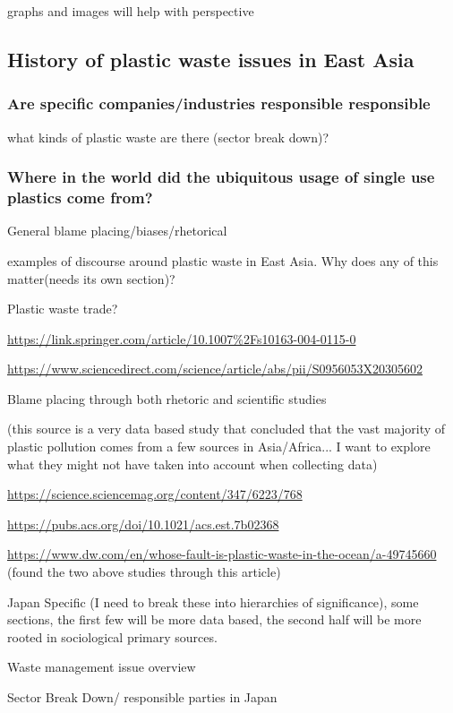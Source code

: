 \documentclass{book}\usepackage{knitr}
\begin{document}
graphs and images will help with perspective

\subsection{History of plastic waste issues in East Asia}

\subsubsection{Are specific companies/industries responsible responsible}

what kinds of plastic waste are there (sector break down)? 

\subsubsection{Where in the world did the ubiquitous usage of single use plastics come from?}

General blame placing/biases/rhetorical 

examples of discourse around plastic waste in East Asia. Why does any of this matter(needs its own section)?

Plastic waste trade? 

\url{https://link.springer.com/article/10.1007%2Fs10163-004-0115-0}

\url{https://www.sciencedirect.com/science/article/abs/pii/S0956053X20305602}

Blame placing through both rhetoric and scientific studies

(this source is a very data based study that concluded that the vast majority of plastic pollution comes from a few sources in Asia/Africa... I want to explore what they might not have taken into account when collecting data)

\url{https://science.sciencemag.org/content/347/6223/768}

\url{https://pubs.acs.org/doi/10.1021/acs.est.7b02368}

\url{https://www.dw.com/en/whose-fault-is-plastic-waste-in-the-ocean/a-49745660} (found the two above studies through this article)

Japan Specific (I need to break these into hierarchies of significance), some sections, the first  few will be more data based, the second half will be more rooted in sociological primary sources.

Waste management issue overview

Sector Break Down/ responsible parties in Japan
\end{document}
